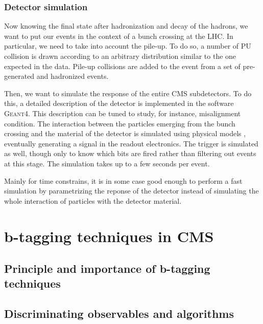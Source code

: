            \subsection{Detector simulation}

            Now knowing the final state after hadronization and decay of the hadrons, we
            want to put our events in the context of a bunch crossing at the LHC. In
            particular, we need to take into account the pile-up. To do so, a number of
            PU collision is drawn according to an arbitrary distribution similar to the
            one expected in the data. Pile-up collisions are added to the event from a
            set of pre-generated and hadronized events.

            Then, we want to simulate the response of the entire CMS subdetectors. To do
            this, a detailed description of the detector is implemented in the software
            \textsc{Geant4}. This description can be tuned to study, for instance,
            misalignment condition. The interaction between the particles emerging from
            the bunch crossing and the material of the detector is simulated using physical
            models , eventually generating a signal in
            the readout electronics. The trigger is simulated as well, though only to know
            which bits are fired rather than filtering out events at this stage. The
            simulation takes up to a few seconds per event.

            Mainly for time constrains, it is in some case good enough to perform a
            fast simulation by parametrizing the reponse of the detector instead of
            simulating the whole interaction of particles with the detector material.

\setcounter{mtc}{3}
\chapter{b-tagging techniques in CMS}
\minitoc
\newpage

    \section{Principle and importance of b-tagging techniques}
        \loremipsum

    \section{Discriminating observables and algorithms}
        \loremipsum
